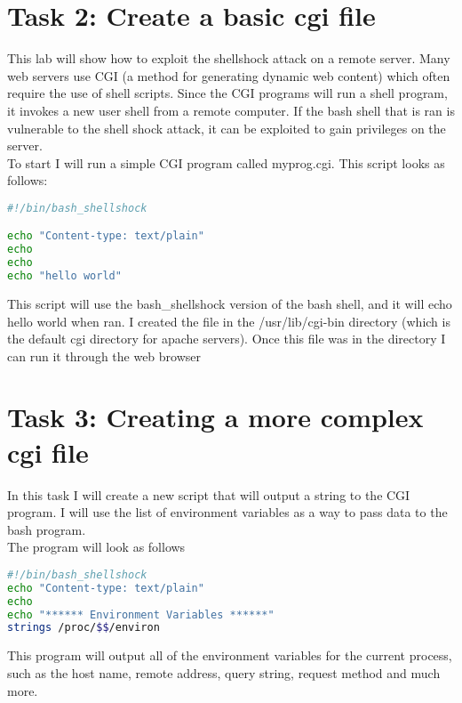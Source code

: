 \documentclass[14pt]{extarticle}
\begin{document}
\section{Task 2: Create a basic cgi file}
This lab will show how to exploit the shellshock attack on a remote server. Many web servers use CGI (a method for generating dynamic web content) which often require the use of shell scripts. Since the CGI programs will run a shell program, it invokes a new user shell from a remote computer. If the bash shell that is ran is vulnerable to the shell shock attack, it can be exploited to gain privileges on the server.\\
To start I will run a simple CGI program called myprog.cgi. This script looks as follows:
\begin{lstlisting}[language=sh]
#!/bin/bash_shellshock

echo "Content-type: text/plain"
echo
echo
echo "hello world"
\end{lstlisting}

This script will use the bash\_shellshock version of the bash shell, and it will echo hello world when ran.
I created the file in the /usr/lib/cgi-bin directory (which is the default cgi directory for apache servers). Once this file was in the directory I can run it through the web browser




\section{Task 3: Creating a more complex cgi file}
In this task I will create a new script that will output a string to the CGI program. I will use the list of environment variables as a way to pass data to the bash program.\\
The program will look as follows
\begin{lstlisting}[language=sh]
#!/bin/bash_shellshock
echo "Content-type: text/plain"
echo
echo "****** Environment Variables ******"
strings /proc/$$/environ
\end{lstlisting}
This program will output all of the environment variables for the current process, such as the host name, remote address, query string, request method and much more.
\end{document}
